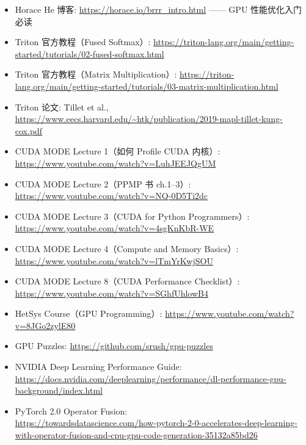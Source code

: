 \documentclass[a4paper]{article}
\begin{document}
\begin{itemize}
    \item Horace He 博客: \url{https://horace.io/brrr_intro.html} —— GPU 性能优化入门必读
    \item Triton 官方教程（Fused Softmax）: \url{https://triton-lang.org/main/getting-started/tutorials/02-fused-softmax.html}
    \item Triton 官方教程（Matrix Multiplication）: \url{https://triton-lang.org/main/getting-started/tutorials/03-matrix-multiplication.html}
    \item Triton 论文: Tillet et al., \url{https://www.eecs.harvard.edu/~htk/publication/2019-mapl-tillet-kung-cox.pdf}
    \item CUDA MODE Lecture 1（如何 Profile CUDA 内核）: \url{https://www.youtube.com/watch?v=LuhJEEJQgUM}
    \item CUDA MODE Lecture 2（PPMP 书 ch.1--3）: \url{https://www.youtube.com/watch?v=NQ-0D5Ti2dc}
    \item CUDA MODE Lecture 3（CUDA for Python Programmers）: \url{https://www.youtube.com/watch?v=4sgKnKbR-WE}
    \item CUDA MODE Lecture 4（Compute and Memory Basics）: \url{https://www.youtube.com/watch?v=lTmYrKwjSOU}
    \item CUDA MODE Lecture 8（CUDA Performance Checklist）: \url{https://www.youtube.com/watch?v=SGhfUhlowB4}
    \item HetSys Course（GPU Programming）: \url{https://www.youtube.com/watch?v=8JGo2zylE80}
    \item GPU Puzzles: \url{https://github.com/srush/gpu-puzzles}
    \item NVIDIA Deep Learning Performance Guide: \url{https://docs.nvidia.com/deeplearning/performance/dl-performance-gpu-background/index.html}
    \item PyTorch 2.0 Operator Fusion:\\ {\small\url{https://towardsdatascience.com/how-pytorch-2-0-accelerates-deep-learning-with-operator-fusion-and-cpu-gpu-code-generation-35132a85bd26}}
\end{itemize}
\end{document}
